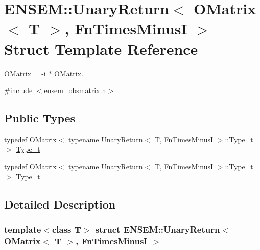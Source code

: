 \hypertarget{structENSEM_1_1UnaryReturn_3_01OMatrix_3_01T_01_4_00_01FnTimesMinusI_01_4}{}\section{E\+N\+S\+EM\+:\+:Unary\+Return$<$ O\+Matrix$<$ T $>$, Fn\+Times\+MinusI $>$ Struct Template Reference}
\label{structENSEM_1_1UnaryReturn_3_01OMatrix_3_01T_01_4_00_01FnTimesMinusI_01_4}


\mbox{\hyperlink{classENSEM_1_1OMatrix}{O\+Matrix}} = -\/i $\ast$ \mbox{\hyperlink{classENSEM_1_1OMatrix}{O\+Matrix}}.  




{\ttfamily \#include $<$ensem\+\_\+obsmatrix.\+h$>$}

\subsection*{Public Types}
\begin{DoxyCompactItemize}
\item 
typedef \mbox{\hyperlink{classENSEM_1_1OMatrix}{O\+Matrix}}$<$ typename \mbox{\hyperlink{structENSEM_1_1UnaryReturn}{Unary\+Return}}$<$ T, \mbox{\hyperlink{structENSEM_1_1FnTimesMinusI}{Fn\+Times\+MinusI}} $>$\+::\mbox{\hyperlink{structENSEM_1_1UnaryReturn_3_01OMatrix_3_01T_01_4_00_01FnTimesMinusI_01_4_a61e8ab0fd80b071e9277449e6f8bd901}{Type\+\_\+t}} $>$ \mbox{\hyperlink{structENSEM_1_1UnaryReturn_3_01OMatrix_3_01T_01_4_00_01FnTimesMinusI_01_4_a61e8ab0fd80b071e9277449e6f8bd901}{Type\+\_\+t}}
\item 
typedef \mbox{\hyperlink{classENSEM_1_1OMatrix}{O\+Matrix}}$<$ typename \mbox{\hyperlink{structENSEM_1_1UnaryReturn}{Unary\+Return}}$<$ T, \mbox{\hyperlink{structENSEM_1_1FnTimesMinusI}{Fn\+Times\+MinusI}} $>$\+::\mbox{\hyperlink{structENSEM_1_1UnaryReturn_3_01OMatrix_3_01T_01_4_00_01FnTimesMinusI_01_4_a61e8ab0fd80b071e9277449e6f8bd901}{Type\+\_\+t}} $>$ \mbox{\hyperlink{structENSEM_1_1UnaryReturn_3_01OMatrix_3_01T_01_4_00_01FnTimesMinusI_01_4_a61e8ab0fd80b071e9277449e6f8bd901}{Type\+\_\+t}}
\end{DoxyCompactItemize}


\subsection{Detailed Description}
\subsubsection*{template$<$class T$>$\newline
struct E\+N\+S\+E\+M\+::\+Unary\+Return$<$ O\+Matrix$<$ T $>$, Fn\+Times\+Minus\+I $>$}


